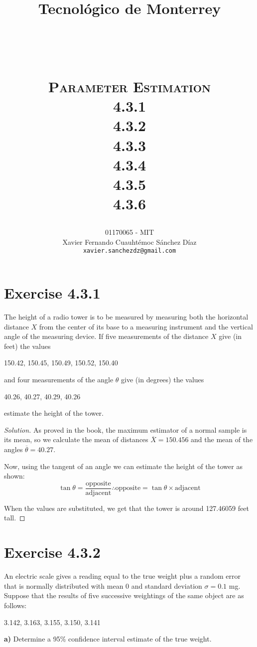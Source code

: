 \documentclass[titlepage, letterpaper]{article} %
\title{
\vspace{1in}
\textbf{Tecnológico de Monterrey} \\
\vspace{0.5in}
\textmd{\mahclass} \\
\large{\textit{\mahteacher}} \\
\vspace{0.5in}
\textsc{\mahtitle}\\
\textsc{Parameter Estimation}\\
\textsc{4.3.1}\\
\textsc{4.3.2}\\
\textsc{4.3.3}\\
\textsc{4.3.4}\\
\textsc{4.3.5}\\
\textsc{4.3.6}\\
\author{01170065  - MIT \\
Xavier Fernando Cuauhtémoc Sánchez Díaz \\
\texttt{xavier.sanchezdz@gmail.com}}
\date{\mahdate}
}
\renewcommand\qedsymbol{\(\blacksquare\)}
\newenvironment{solution}
{\renewcommand\qedsymbol{$\square$}\begin{proof}[Solution]}
{\end{proof}}
\begin{document}
\begin{titlepage}
\maketitle
\end{titlepage}

%
%

\section{Exercise 4.3.1}

{\large The height of a radio tower is to be measured by measuring both the horizontal distance $X$ from the center of its base to a measuring instrument and the vertical angle of the measuring device.
If five measurements of the distance $X$ give (in feet) the values

150.42, 150.45, 150.49, 150.52, 150.40

and four measurements of the angle $\theta$ give (in degrees) the values

40.26, 40.27, 40.29, 40.26

estimate the height of the tower.}

\begin{solution}
As proved in the book, the maximum estimator of a normal sample is its mean, so we calculate the mean of distances $\overline{X} = 150.456$ and the mean of the angles $\overline{\theta} = 40.27$.

Now, using the tangent of an angle we can estimate the height of the tower as shown:
\[\tan \theta = \frac{\text{opposite}}{\text{adjacent}} \therefore \text{opposite} = \tan\theta \times \text{adjacent}\]

When the values are substituted, we get that the tower is around 127.46059 feet tall.
\end{solution}

\section{Exercise 4.3.2}

{\large An electric scale gives a reading equal to the true weight plus a random error that is normally distributed with mean 0 and standard deviation $\sigma = 0.1$ mg.
Suppose that the results of five successive weightings of the same object are as follows:

3.142, 3.163, 3.155, 3.150, 3.141

\textbf{a)} Determine a 95\% confidence interval estimate of the true weight.}
\end{document}
